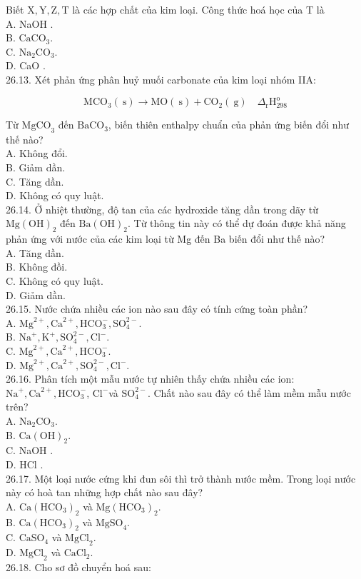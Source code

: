 \documentclass[10pt]{article}
\begin{document}
Biết $\mathrm{X}, \mathrm{Y}, \mathrm{Z}, \mathrm{T}$ là các hợp chất của kim loại. Công thức hoá học của T là\\
A. NaOH .\\
B. $\mathrm{CaCO}_{3}$.\\
C. $\mathrm{Na}_{2} \mathrm{CO}_{3}$.\\
D. CaO .\\
26.13. Xét phản ứng phân huỷ muối carbonate của kim loại nhóm IIA:

$$
\mathrm{MCO}_{3}(\mathrm{~s}) \longrightarrow \mathrm{MO}(\mathrm{~s})+\mathrm{CO}_{2}(\mathrm{~g}) \quad \Delta_{\mathrm{r}} \mathrm{H}_{298}^{\mathrm{o}}
$$

Từ $\mathrm{MgCO}_{3}$ đến $\mathrm{BaCO}_{3}$, biến thiên enthalpy chuẩn của phản ứng biến đổi như thế nào?\\
A. Không đổi.\\
B. Giảm dần.\\
C. Tăng dần.\\
D. Không có quy luật.\\
26.14. Ở nhiệt thường, độ tan của các hydroxide tăng dần trong dãy từ $\mathrm{Mg}(\mathrm{OH})_{2}$ đến $\mathrm{Ba}(\mathrm{OH})_{2}$. Từ thông tin này có thể dự đoán được khả năng phản ứng với nước của các kim loại từ Mg đến Ba biến đổi như thế nào?\\
A. Tăng dần.\\
B. Không đồi.\\
C. Không có quy luật.\\
D. Giảm dần.\\
26.15. Nước chứa nhiều các ion nào sau đây có tính cứng toàn phần?\\
A. $\mathrm{Mg}^{2+}, \mathrm{Ca}^{2+}, \mathrm{HCO}_{3}^{-}, \mathrm{SO}_{4}^{2-}$.\\
B. $\mathrm{Na}^{+}, \mathrm{K}^{+}, \mathrm{SO}_{4}^{2-}, \mathrm{Cl}^{-}$.\\
C. $\mathrm{Mg}^{2+}, \mathrm{Ca}^{2+}, \mathrm{HCO}_{3}^{-}$.\\
D. $\mathrm{Mg}^{2+}, \mathrm{Ca}^{2+}, \mathrm{SO}_{4}^{2-}, \mathrm{Cl}^{-}$.\\
26.16. Phân tích một mẫu nước tự nhiên thấy chứa nhiều các ion: $\mathrm{Na}^{+}, \mathrm{Ca}^{2+}, \mathrm{HCO}_{3}^{-}$, $\mathrm{Cl}^{-}$và $\mathrm{SO}_{4}^{2-}$. Chất nào sau đây có thể làm mềm mẫu nước trên?\\
A. $\mathrm{Na}_{2} \mathrm{CO}_{3}$.\\
B. $\mathrm{Ca}(\mathrm{OH})_{2}$.\\
C. NaOH .\\
D. HCl .\\
26.17. Một loại nước cứng khi đun sôi thì trở thành nước mềm. Trong loại nước này có hoà tan những hợp chất nào sau đây?\\
A. $\mathrm{Ca}\left(\mathrm{HCO}_{3}\right)_{2}$ và $\mathrm{Mg}\left(\mathrm{HCO}_{3}\right)_{2}$.\\
B. $\mathrm{Ca}\left(\mathrm{HCO}_{3}\right)_{2}$ và $\mathrm{MgSO}_{4}$.\\
C. $\mathrm{CaSO}_{4}$ và $\mathrm{MgCl}_{2}$.\\
D. $\mathrm{MgCl}_{2}$ và $\mathrm{CaCl}_{2}$.\\
26.18. Cho sơ đồ chuyển hoá sau:
\end{document}
